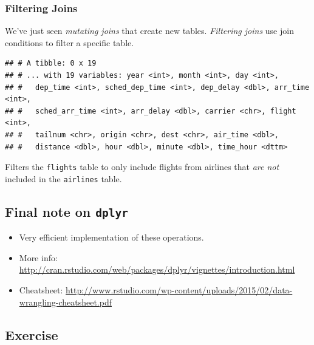 \documentclass[]{article}
\newenvironment{Shaded}{\begin{snugshade}}{\end{snugshade}}
\newcommand{\KeywordTok}[1]{\textcolor[rgb]{0.13,0.29,0.53}{\textbf{{#1}}}}
\newcommand{\DataTypeTok}[1]{\textcolor[rgb]{0.13,0.29,0.53}{{#1}}}
\newcommand{\StringTok}[1]{\textcolor[rgb]{0.31,0.60,0.02}{{#1}}}
\newcommand{\NormalTok}[1]{{#1}}
\theoremstyle{definition}
\theoremstyle{definition}
\theoremstyle{remark}
\begin{document}
\subsubsection{Filtering Joins}\label{filtering-joins}

We've just seen \emph{mutating joins} that create new tables.
\emph{Filtering joins} use join conditions to filter a specific table.

\begin{Shaded}
\end{Shaded}

\begin{verbatim}
## # A tibble: 0 x 19
## # ... with 19 variables: year <int>, month <int>, day <int>,
## #   dep_time <int>, sched_dep_time <int>, dep_delay <dbl>, arr_time <int>,
## #   sched_arr_time <int>, arr_delay <dbl>, carrier <chr>, flight <int>,
## #   tailnum <chr>, origin <chr>, dest <chr>, air_time <dbl>,
## #   distance <dbl>, hour <dbl>, minute <dbl>, time_hour <dttm>
\end{verbatim}

Filters the \texttt{flights} table to only include flights from airlines
that \emph{are not} included in the \texttt{airlines} table.

\subsection{\texorpdfstring{Final note on
\texttt{dplyr}}{Final note on dplyr}}\label{final-note-on-dplyr}

\begin{itemize}
\itemsep1pt\parskip0pt
\item
  Very efficient implementation of these operations.
\item
  More info:
  \href{http://cran.rstudio.com/web/packages/dplyr/vignettes/introduction.html}{\url{http://cran.rstudio.com/web/packages/dplyr/vignettes/introduction.html}}
\item
  Cheatsheet:
  \href{http://www.rstudio.com/wp-content/uploads/2015/02/data-wrangling-cheatsheet.pdf}{\url{http://www.rstudio.com/wp-content/uploads/2015/02/data-wrangling-cheatsheet.pdf}}
\end{itemize}

\subsection{Exercise}\label{exercise}
\end{document}

